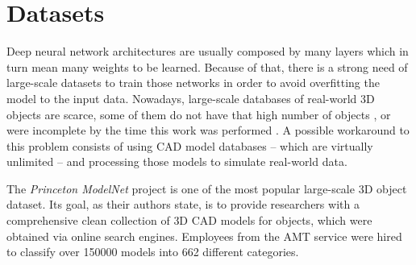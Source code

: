 \section{Datasets}
\label{cha:objrecog:sec:datasets}

Deep neural network architectures are usually composed by many layers which in turn mean many weights to be learned. Because of that, there is a strong need of large-scale datasets to train those networks in order to avoid overfitting the model to the input data. Nowadays, large-scale databases of real-world \acs{3D} objects are scarce, some of them do not have that high number of objects \cite{Lai2011}\cite{Singh2014}\cite{Li2014}, or were incomplete by the time this work was performed \cite{Choi2016}. A possible workaround to this problem consists of using \ac{CAD} model databases -- which are virtually unlimited -- and processing those models to simulate real-world data.

The \emph{Princeton ModelNet} project is one of the most popular large-scale \acs{3D} object dataset. Its goal, as their authors state, is to provide researchers with a comprehensive clean collection of \acs{3D} \ac{CAD} models for objects, which were obtained via online search engines. Employees from the \ac{AMT} service were hired to classify over \num{150000} models into \num{662} different categories.

